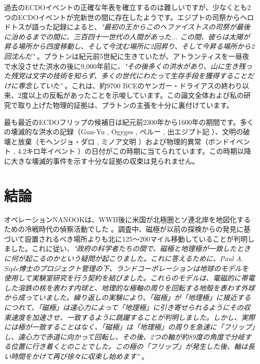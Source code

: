 \documentclass[10pt,twocolumn,letterpaper]{article}
\begin{document}
過去のECDOイベントの正確な年表を確立するのは難しいですが、少なくとも2つのECDOイベントが完新世の間に存在したようです。エジプトの司祭からヘロドトスが語った記録によると、\textit{"最初の王からこのヘファイストスの司祭が最後に治めるまでの間に、三百四十一世代の人間があった... この間、彼らは太陽が昇る場所から四度移動し、そして今沈む場所に2回昇り、そして今昇る場所から2回沈んだ"} \cite{32}。プラトンは紀元前5世紀に生きていたが\cite{111}、アトランティスを一昼夜で水没させた洪水の後に9,000年前に、\textit{"その後多くの洪水があり、山に生き残った残党は文字の技術を知らず、多くの世代にわたって生存手段を獲得することだけに専念していた"} \cite{112}。これは、約9700 BCEのヤンガー・ドライアスの終わり以来、2度以上の反転があったことを示唆しています。この論文全体および私の研究で取り上げた物理的証拠\cite{2}は、プラトンの主張を十分に裏付けています。

最も最近のECDOフリップの候補日は紀元前2300年から1600年の期間です。多くの壊滅的な洪水の記録（Gun-Yu \cite{113,114,115}, Ogyges \cite{116,117}, ペルー \cite{118,119}, 出エジプト記 \cite{120}）、文明の破壊と放棄（モヘンジョ・ダロ \cite{121}, ミノア文明 \cite{100,101}）および物理的異常（ボンドイベント \cite{122}, 4.2キロ年イベント \cite{90}）の日付がこの時期に当てられています。この時期以降に大きな壊滅的事件を示す十分な証拠の収束は見られません。

\section{結論}

オペレーションNANOOKは、WWII後に米国が北極圏とソ連北岸を地図化するための冷戦時代の偵察活動でした \cite{137}。調査中、磁極が以前の探検からの発見に基づいて設置されるべき場所よりも北に125〜200マイル移動していることが判明しました。これに従い、\textit{"政府の科学者たちの間で、磁極と地理極が一致したときに何が起こるのかという疑問が起こりました。これに答えるために、Paul A. Siple博士のプロジェクト管理の下、ランドコーポレーションは地球のモデルを使用して実験室研究を行う契約を結びました。これらのモデルは、電磁的に帯電した溶鉄の核を表わす内球と、地理的な極軸の周りを回転する地殻を表わす外球から成っていました。繰り返しの実験により、「磁極」が「地理極」に接近するにつれて、「磁極」は遠心力によって「地理極」に引き寄せられるようにその収束速度を加速させ、一致するように跳躍することが判明しました。しかし、実際には極が一致することはなく、「磁極」は「地理極」の周りを急速に「フリップ」し、遠心力で赤道に向かって回転し、その後、2つの軸が約89度の角度で分岐する位置に行き着くとのことでした。この極の「フリップ」が発生した後、軸は長い時間をかけて再び徐々に収束し始めます"} \cite{138,139}。
\end{document}
